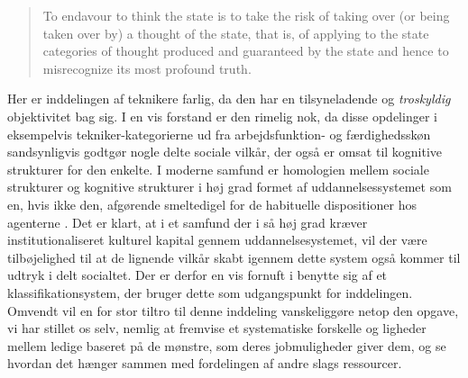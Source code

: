 %
 \begin{quote} \small %
	To endavour to think the state is to take the risk of taking over (or being taken over by) a thought of the state, that is, of applying to the state categories of thought produced and 	guaranteed by the state and hence to misrecognize its most profound truth. 
 \end{quote}
Her er inddelingen af teknikere farlig, da den har en tilsyneladende og \emph{troskyldig} objektivitet bag sig. I en vis forstand er den rimelig nok, da disse opdelinger i eksempelvis tekniker-kategorierne ud fra arbejdsfunktion- og færdighedsskøn sandsynligvis godtgør nogle delte sociale vilkår, der også er omsat til kognitive strukturer for den enkelte. I moderne samfund er homologien mellem sociale strukturer og kognitive strukturer i høj grad formet af uddannelsessystemet som en, hvis ikke den, afgørende smeltedigel for de habituelle dispositioner hos agenterne \parencite[12]{Bourdieu1992}. Det er klart, at i et samfund der i så høj grad kræver institutionaliseret kulturel kapital gennem uddannelsesystemet, vil der være tilbøjelighed til at de lignende vilkår skabt igennem dette system også kommer til udtryk i delt socialtet. Der er derfor en vis fornuft i benytte sig af et klassifikationsystem, der bruger dette som udgangspunkt for inddelingen. Omvendt vil en for stor tiltro til denne inddeling vanskeliggøre netop den opgave, vi har stillet os selv, nemlig at fremvise et systematiske forskelle og ligheder mellem ledige baseret på de mønstre, som deres jobmuligheder giver dem, og se hvordan det hænger sammen med fordelingen af andre slags ressourcer. 

